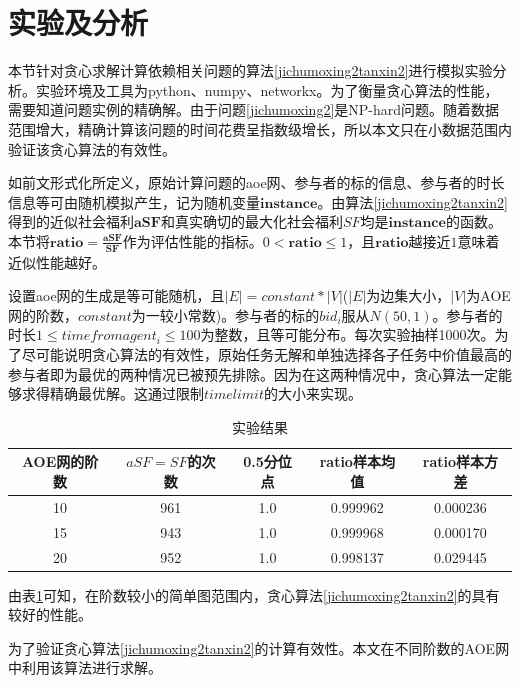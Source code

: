 \documentclass[promaster]{thesis-uestc}
\begin{document}
\section{实验及分析}
本节针对贪心求解计算依赖相关问题的算法\ref{jichumoxing2tanxin2}进行模拟实验分析。实验环境及工具为python、numpy、networkx。为了衡量贪心算法的性能，需要知道问题实例的精确解。由于问题\ref{jichumoxing2}是NP-hard问题。随着数据范围增大，精确计算该问题的时间花费呈指数级增长，所以本文只在小数据范围内验证该贪心算法的有效性。

如前文形式化所定义，原始计算问题的aoe网、参与者的标的信息、参与者的时长信息等可由随机模拟产生，记为随机变量$\mathbf{instance}$。由算法\ref{jichumoxing2tanxin2}得到的近似社会福利$\mathbf{aSF}$和真实确切的最大化社会福利$SF$均是$\mathbf{instance}$的函数。本节将$\mathbf{ratio} = \frac{\mathbf{aSF}}{\mathbf{SF}}$作为评估性能的指标。$0<\mathbf{ratio} \leq 1$，且$\mathbf{ratio}$越接近$1$意味着近似性能越好。

设置aoe网的生成是等可能随机，且$|E|=constant*|V|$($|E|$为边集大小，$|V|$为AOE网的阶数，$constant$为一较小常数)。参与者的标的$bid_i$服从$N(50,1)$。参与者的时长$1\leq timefromagent_i\leq 100$为整数，且等可能分布。每次实验抽样1000次。为了尽可能说明贪心算法的有效性，原始任务无解和单独选择各子任务中价值最高的参与者即为最优的两种情况已被预先排除。因为在这两种情况中，贪心算法一定能够求得精确最优解。这通过限制$timelimit$的大小来实现。

\begin{table}[h]
\caption{实验结果}
\label{jinsizhibiao}
\begin{tabular}{ccccc}
    \toprule
    AOE网的阶数&$aSF=SF$的次数&0.5分位点&ratio样本均值&ratio样本方差\\
    \midrule
    10&961&1.0&0.999962&0.000236\\
    15&943&1.0&0.999968&0.000170\\
    20&952&1.0&0.998137&0.029445\\
    \bottomrule
\end{tabular}
\end{table}

由表\ref{jinsizhibiao}可知，在阶数较小的简单图范围内，贪心算法\ref{jichumoxing2tanxin2}的具有较好的性能。

为了验证贪心算法\ref{jichumoxing2tanxin2}的计算有效性。本文在不同阶数的AOE网中利用该算法进行求解。
\end{document}
